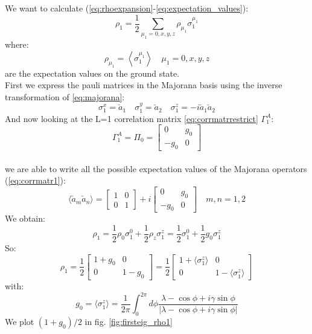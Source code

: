 \documentclass[12pt,a4paper]{book}
\theoremstyle{definition}
\begin{document}
We want to calculate (\ref{eq:rhoexpansion}-\ref{eq:expectation_values}):
\begin{equation}
	\rho_{1}=\frac{1}{2}\sum_{\mu_{1}=0, x, y, z} \rho_{\mu_{1}} \sigma_{1}^{\mu_{1}} 
\end{equation}
where:
\begin{equation}\label{eq:1sitepauli}
	\rho_{\mu_{1}}=\left\langle\sigma_{1}^{\mu_{1}}\right\rangle \quad \mu_{1}=0, x, y, z
\end{equation}
are the expectation values on the ground state.\\
First we express the pauli matrices in the Majorana basis using the inverse transformation of \ref{eq:majorana}:
\begin{equation}
	\sigma_1^x=\check{a}_1  \quad
	\sigma_1^y=\check{a}_2  \quad
	\sigma_1^z=-i\check{a}_1\check{a}_2
\end{equation}
And now looking at the L=1 correlation matrix  \ref{eq:corrmatrrestrict} $\Gamma^{A}_1$:
\begin{equation}
	\Gamma^{A}_1=
	\Pi_{0} = \left[\begin{array}{cc}
		0 & g_0 \\
		-g_0 & 0
	\end{array}\right]
\end{equation}\\
we are able to write all the possible expectation values of the Majorana operators (\ref{eq:corrmatr1}):
\begin{equation}
	\langle\check{a}_{m} \check{a}_{n}\rangle= \left[\begin{array}{cc}
		1 & 0 \\
		0 & 1
	\end{array}\right]+i\left[\begin{array}{cc}
		0 & g_0 \\
		-g_0 & 0
	\end{array}\right]
	\quad m,n=1,2
\end{equation}
We obtain:
\begin{equation}
	\rho_{1}=\frac{1}{2} \rho_{0} \sigma_{1}^{0} + \frac{1}{2} \rho_{z} \sigma_{1}^{z}=\frac{1}{2} \sigma_{1}^{0}+\frac{1}{2} g_0\sigma_{1}^{z}
\end{equation}
So:
\begin{equation}
	\rho_{1}=\frac{1}{2}\left[\begin{array}{cc}
		1+g_0 & 0 \\
		0 & 1-g_0
	\end{array}\right]
 =\frac{1}{2}\left[\begin{array}{cc}
		1+\langle{\sigma}_{1}^{z}\rangle & 0 \\
		0 & 1-\langle{\sigma}_{1}^{z}\rangle
	\end{array}\right]
\end{equation}
with:
\begin{equation}\label{eq:g_0coff}
	g_0=	\langle{\sigma}_{1}^{z}\rangle = \frac{1}{2 \pi} \int_{0}^{2 \pi} d \phi \frac{\lambda-\cos \phi+i \gamma\sin \phi}{|\lambda-\cos\phi +i  \gamma \sin \phi|}
\end{equation}
We plot  $(1+g_0)/2$ in fig. \ref{fig:firsteig_rho1}
\\
\end{document}
